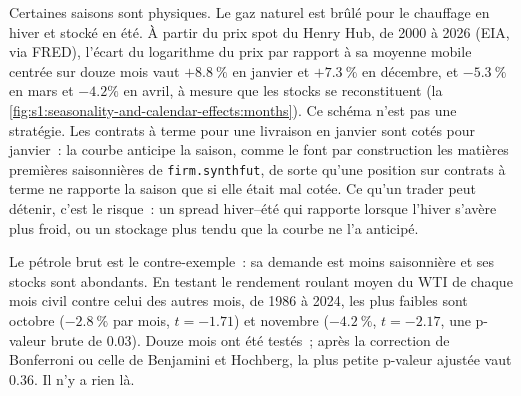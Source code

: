 Certaines saisons sont physiques. Le gaz naturel est brûlé pour le chauffage en hiver et stocké en été. À partir du prix spot du Henry Hub, de 2000 à 2026 (EIA, via
FRED), l'écart du logarithme du prix par rapport à sa moyenne mobile centrée sur douze mois vaut $+8.8~\%$ en janvier et $+7.3~\%$ en décembre, et $-5.3~\%$ en mars et
$-4.2\%$ en avril, à mesure que les stocks se reconstituent (la \cref{fig:s1:seasonality-and-calendar-effects:months}). Ce schéma n'est pas une stratégie. Les contrats à terme pour une livraison en janvier
sont cotés pour janvier~: la courbe anticipe la saison, comme le font par construction les matières premières saisonnières de \texttt{firm.synthfut}, de sorte qu'une position sur contrats à terme
ne rapporte la saison que si elle était mal cotée. Ce qu'un trader peut détenir, c'est le risque~: un spread hiver--été qui rapporte lorsque l'hiver s'avère plus froid, ou
un stockage plus tendu que la courbe ne l'a anticipé.

Le pétrole brut est le contre-exemple~: sa demande est moins saisonnière et ses stocks sont abondants. En testant le rendement roulant moyen du WTI de chaque mois civil contre celui
des autres mois, de 1986 à 2024, les plus faibles sont octobre ($-2.8~\%$ par mois, $t = -1.71$) et novembre ($-4.2~\%$, $t = -2.17$, une p-valeur brute de 0.03). Douze
mois ont été testés~; après la correction de Bonferroni ou celle de Benjamini et Hochberg, la plus petite p-valeur ajustée vaut 0.36. Il n'y a rien là.

\begin{omfigure}

\label{fig:s1:seasonality-and-calendar-effects:months}
\end{omfigure}


